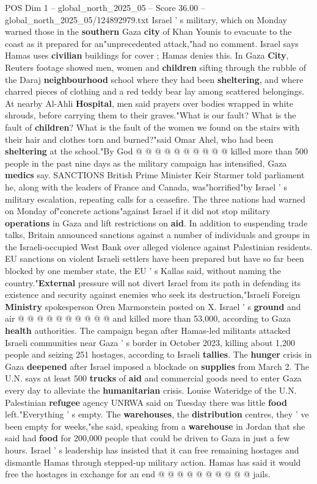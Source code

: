\begin{textsample}{POS Dim 1 – global\_north\_2025\_05 – Score 36.00 – global\_north\_2025\_05/124892979.txt}
Israel ' s military, which on Monday warned those in the \textbf{southern} Gaza \textbf{city} of Khan Younis to evacuate to the coast as it prepared for an"unprecedented attack,"had no comment.
Israel says Hamas uses \textbf{civilian} buildings for cover ; Hamas denies this.
In Gaza \textbf{City}, Reuters footage showed men, women and \textbf{children} sifting through the rubble of the Daraj \textbf{neighbourhood} school where they had been \textbf{sheltering}, and where charred pieces of clothing and a red teddy bear lay among scattered belongings.
At nearby Al-Ahli \textbf{Hospital}, men said prayers over bodies wrapped in white shrouds, before carrying them to their graves."What is our fault?
What is the fault of \textbf{children}?
What is the fault of the women we found on the stairs with their hair and clothes torn and burned?"said Omar Ahel, who had been \textbf{sheltering} at the school."By God @ @ @ @ @ @ @ @ @ @ killed more than 500 people in the past nine days as the military campaign has intensified, Gaza \textbf{medics} say.
SANCTIONS British Prime Minister Keir Starmer told parliament he, along with the leaders of France and Canada, was"horrified"by Israel ' s military escalation, repeating calls for a ceasefire.
The three nations had warned on Monday of"concrete actions"against Israel if it did not stop military \textbf{operations} in Gaza and lift restrictions on \textbf{aid}.
In addition to suspending trade talks, Britain announced sanctions against a number of individuals and groups in the Israeli-occupied West Bank over alleged violence against Palestinian residents.
EU sanctions on violent Israeli settlers have been prepared but have so far been blocked by one member state, the EU ' s Kallas said, without naming the country."\textbf{External} pressure will not divert Israel from its path in defending its existence and security against enemies who seek its destruction,"Israeli Foreign \textbf{Ministry} spokesperson Oren Marmorstein posted on X.
Israel ' s \textbf{ground} and air @ @ @ @ @ @ @ @ @ @ and killed more than 53,000, according to Gaza \textbf{health} authorities.
The campaign began after Hamas-led militants attacked Israeli communities near Gaza ' s border in October 2023, killing about 1,200 people and seizing 251 hostages, according to Israeli \textbf{tallies}.
The \textbf{hunger} crisis in Gaza \textbf{deepened} after Israel imposed a blockade on \textbf{supplies} from March 2.
The U.N. says at least 500 \textbf{trucks} of \textbf{aid} and commercial goods need to enter Gaza every day to alleviate the \textbf{humanitarian} crisis.
Louise Wateridge of the U.N.
Palestinian \textbf{refugee} agency UNRWA said on Tuesday there was little \textbf{food} left."Everything ' s empty.
The \textbf{warehouses}, the \textbf{distribution} centres, they ' ve been empty for weeks,"she said, speaking from a \textbf{warehouse} in Jordan that she said had \textbf{food} for 200,000 people that could be driven to Gaza in just a few hours.
Israel ' s leadership has insisted that it can free remaining hostages and dismantle Hamas through stepped-up military action.
Hamas has said it would free the hostages in exchange for an end @ @ @ @ @ @ @ @ @ @ jails.


\end{textsample}
